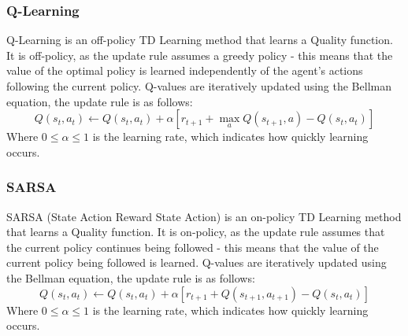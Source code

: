 \subsubsection{Q-Learning}
Q-Learning \citep{Watkins:1989, journals/ml/WatkinsD92} is an off-policy TD Learning method that learns a Quality function. It is off-policy, as the update rule assumes a greedy policy - this means that the value of the optimal policy is learned independently of the agent's actions following the current policy. Q-values are iteratively updated using the Bellman equation, the update rule is as follows:
\begin{equation}
\label{eqn:qlearningupdate}
Q(s_t,a_t) \leftarrow Q(s_t,a_t) + \alpha[r_{t+1} + \max_aQ(s_{t+1}, a) -Q(s_t,a_t)]
\end{equation}
Where $0 \le \alpha \le 1$ is the learning rate, which indicates how quickly learning occurs.
\subsubsection{SARSA}
SARSA (State Action Reward State Action) \citep{rummery:cuedtr94} is an on-policy TD Learning method that learns a Quality function. It is on-policy, as the update rule assumes that the current policy continues being followed - this means that the value of the current policy being followed is learned. Q-values are iteratively updated using the Bellman equation, the update rule is as follows:
\begin{equation}
\label{eqn:sarsaupdate}
Q(s_t, a_t) \leftarrow Q(s_t, a_t) + \alpha[r_{t+1} + Q(s_{t+1}, a_{t+1})-Q(s_t, a_t)]
\end{equation}
Where $0 \le \alpha \le 1$ is the learning rate, which indicates how quickly learning occurs.
